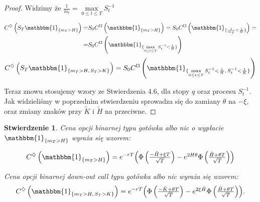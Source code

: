 \documentclass[11pt]{report}
\newtheorem{stw}{Stwierdzenie}[chapter]
\newcommand*{\Scale}[2][4]{\scalebox{#1}{$#2$}}%
\begin{document}
\begin{proof}
Widzimy że $\frac{1}{m_t} = \max\limits_{0 \le t \le T} S_t^{-1} $

\begin{equation*}
\begin{split}
C^{\diamondsuit}\left( S_T \mathbbm{1}_{ \{ m_T>H \} } \right)  = & S_0 C^{\mho}\left(\mathbbm{1}_{ \{ m_T>H \} } \right) = S_0 C^{\mho}\left( \mathbbm{1}_{ \{ \frac{1}{m_T} < \frac{1}{H}  \} }  \right) = \\ = & S_0 C^{\mho}\left( \mathbbm{1}_{ \{ \max\limits_{0 \le t \le T} S_t^{-1} < \frac{1}{H}  \} } \right)
\end{split}
\end{equation*}
\begin{equation*}
C^{\diamondsuit}\left( S_T \mathbbm{1}_{ \{ m_T>H, \, S_T > K \} } \right)  = S_0 C^{\mho}\left(\mathbbm{1}_{ \{ \max\limits_{0 \le t \le T} S_t^{-1} < \frac{1}{H}, \, S_t^{-1} < \frac{1}{K} \} } \right)
\end{equation*}

Teraz znowu stosujemy wzory ze Stwierdzenia 4.6, dla stopy $q$ oraz procesu $S_t^{-1}$. Jak widzieliśmy w poprzednim stwierdzeniu sprowadza się do zamiany $\theta$ na $-\xi$, oraz zmiany znaków przy $\tilde{K}$ i $\tilde{H}$ na przeciwne. 
\end{proof}

\begin{stw} 
Cena opcji binarnej typu gotówka albo nic o wypłacie $\mathbbm{1}_{\{ m_T > H \}}$ wyraża się wzorem:

\begin{equation*}
C^{\diamondsuit} \left( \mathbbm{1}_{\{ m_T > H \}} \right) = e^{-rT} \Scale[1.0]{ \left(\Phi \left(\frac{ -\tilde{H}+\xi T }{\sqrt{T}}\right) - e^{2H\theta}\Phi\left(\frac{ \tilde{H}+\theta T }{\sqrt{T}}\right)\right) }
\end{equation*}

$ $ \\
Cena opcji binarnej down-out call typu gotówka albo nic wyraża się wzorem: 
\begin{equation*}
C^{\diamondsuit}\left(\mathbbm{1}_{\{ m_T > H,\, S_T > K \}}\right) = e^{-rT} \Scale[1.0]{\left(\Phi\left(\frac{ -\tilde{K} + \theta T }{\sqrt{T}}\right) - e^{2 \xi \tilde{H}}\Phi\left(\frac{ \tilde{H}+\theta T }{\sqrt{T}}\right) \right)}.
\end{equation*}





\end{stw}
\end{document}
